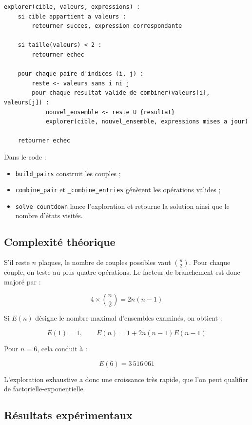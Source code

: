 \begin{lstlisting}[basicstyle=\ttfamily,label={lst:tp2-exploration}]
explorer(cible, valeurs, expressions) :
    si cible appartient a valeurs :
        retourner succes, expression correspondante

    si taille(valeurs) < 2 :
        retourner echec

    pour chaque paire d'indices (i, j) :
        reste <- valeurs sans i ni j
        pour chaque resultat valide de combiner(valeurs[i], valeurs[j]) :
            nouvel_ensemble <- reste U {resultat}
            explorer(cible, nouvel_ensemble, expressions mises a jour)

    retourner echec
\end{lstlisting}

Dans le code :

\begin{itemize}
	\item \texttt{build\_pairs} construit les couples ;
	\item \texttt{combine\_pair} et \texttt{\_combine\_entries} g\'{e}n\`{e}rent les
	      op\'{e}rations valides ;
	\item \texttt{solve\_countdown} lance l'exploration et retourne la solution
	      ainsi que le nombre d'\'{e}tats visit\'{e}s.
\end{itemize}

\subsection{Complexit\'{e} th\'{e}orique}\label{subsec:tp2-complexite}

S'il reste \(n\) plaques, le nombre de couples possibles vaut
\(\binom{n}{2}\).
Pour chaque couple, on teste au plus quatre op\'{e}rations.
Le
facteur de branchement est donc major\'{e} par :

\[
	4 \times \binom{n}{2} = 2n(n-1)
\]

Si \(E(n)\) d\'{e}signe le nombre maximal d'ensembles examin\'{e}s, on obtient :

\[
	E(1) = 1, \qquad E(n) = 1 + 2n(n-1)E(n-1)
\]

Pour \(n = 6\), cela conduit \`{a} :

\[
	E(6) = 3\,516\,061
\]

L'exploration exhaustive a donc une croissance tr\`{e}s rapide, que l'on peut
qualifier de factorielle-exponentielle.

\subsection{R\'{e}sultats exp\'{e}rimentaux}\label{subsec:tp2-resultats}

